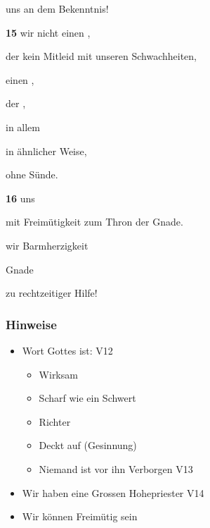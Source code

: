       uns  an dem Bekenntnis!

\textbf{15}  wir  nicht einen ,

    der kein Mitleid   mit unseren Schwachheiten, 

         einen , 

            der ,  

            in allem 

            in ähnlicher Weise, 

     ohne Sünde.

\textbf{16}   uns 

     mit Freimütigkeit  zum Thron der Gnade. 

     wir Barmherzigkeit  

         Gnade  

    zu rechtzeitiger Hilfe!

\subsubsection{Hinweise}
\begin{itemize}     
    \item Wort Gottes ist: V12
    \begin{itemize}       
        \item Wirksam
        \item Scharf wie ein Schwert
        \item Richter
        \item Deckt auf (Gesinnung)
        \item Niemand ist vor ihn Verborgen V13
    \end{itemize}
    \item Wir haben eine Grossen Hohepriester V14
    \item Wir können Freimütig sein
\end{itemize}

